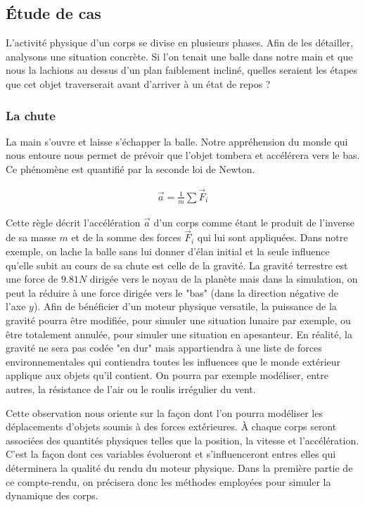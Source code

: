\subsection{\'Etude de cas}

L'activité physique d'un corps se divise en plusieurs phases. Afin de les détailler, analysons une situation concrète. Si l'on tenait une balle dans notre main et que nous la lachions au dessus d'un plan faiblement incliné, quelles seraient les étapes que cet objet traverserait avant d'arriver à un état de repos ?

\subsubsection{La chute}

La main s'ouvre et laisse s'échapper la balle. Notre appréhension du monde qui nous entoure nous permet de prévoir que l'objet tombera et accélérera vers le bas. Ce phénomène est quantifié par la seconde loi de Newton.

\begin{align*}
  \vec{a} = \frac{1}{m} \sum{\vec{F}_i}
\end{align*}

Cette règle décrit l'accélération $\vec{a}$ d'un corps comme étant le produit de l'inverse de sa masse $m$ et de la somme des forces $\vec{F}_i$ qui lui sont appliquées. Dans notre exemple, on lache la balle sans lui donner d'élan initial et la seule influence qu'elle subit au cours de sa chute est celle de la gravité. La gravité terrestre est une force de $9.81 N$ dirigée vers le noyau de la planète mais dans la simulation, on peut la réduire à une force dirigée vers le "bas" (dans la direction négative de l'axe $y$). Afin de bénéficier d'un moteur physique versatile, la puissance de la gravité pourra être modifiée, pour simuler une situation lunaire par exemple, ou être totalement annulée, pour simuler une situation en apesanteur. En réalité, la gravité ne sera pas codée "en dur" mais appartiendra à une liste de forces environnementales qui contiendra toutes les influences que le monde extérieur applique aux objets qu'il contient. On pourra par exemple modéliser, entre autres, la résistance de l'air ou le roulis irrégulier du vent.

Cette observation nous oriente sur la façon dont l'on pourra modéliser les déplacements d'objets soumis à des forces extérieures. \`A chaque corps seront associées des quantités physiques telles que la position, la vitesse et l'accélération. C'est la façon dont ces variables évolueront et s'influenceront entres elles qui déterminera la qualité du rendu du moteur physique. Dans la première partie de ce compte-rendu, on précisera donc les méthodes employées pour simuler la dynamique des corps.

